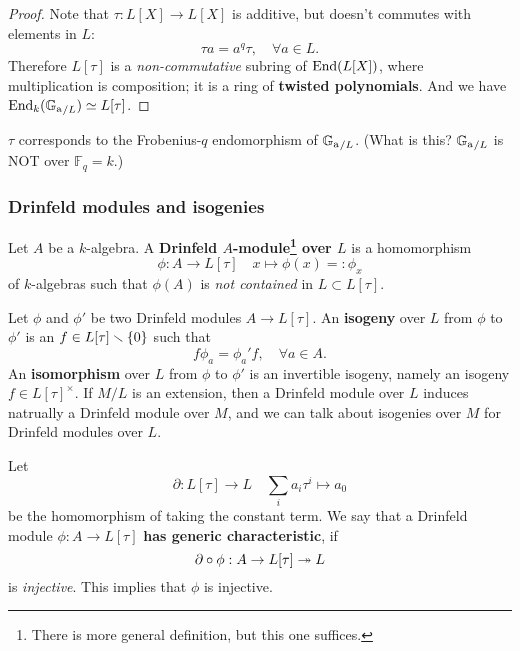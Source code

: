 \documentclass{article}
\newcommand{\F}{\mathbb{F}}
\begin{document}
\begin{proof}
    Note that $\tau : L[X]\to L[X]$ is additive,
    but doesn't commutes with elements in $L$: \[\tau a = a^q\tau,\quad\forall a\in L.\]
    Therefore $L[\tau]$ is a \textit{non-commutative} subring of $\operatorname{End}(L[X])$, where multiplication is composition;
    it is a ring of \textbf{twisted polynomials}. And we have $\operatorname{End}_{k}({\mathbb{G}_{\mathrm{a}}}_{/L})\simeq L[\tau]$.
\end{proof}
\begin{remark}
    $\tau$ corresponds to the Frobenius-$q$ endomorphism of ${\mathbb{G}_{\mathrm{a}}}_{/L}$. (What is this? ${\mathbb{G}_{\mathrm{a}}}_{/L}$ is NOT over $\F_q = k$.)
\end{remark}

\subsubsection{Drinfeld modules and isogenies}
Let $A$ be a $k$-algebra.
A \textbf{Drinfeld $A$-module\footnote{
    There is more general definition, but this one suffices.
} over $L$} is a homomorphism
\[\phi : A\to L[\tau]\quad x\mapsto \phi(x) =: \phi_x\]
of $k$-algebras such that $\phi(A)$ is \textit{not contained} in $L\subset L[\tau]$.

Let $\phi$ and $\phi'$ be two Drinfeld modules $A\to L[\tau]$.
An \textbf{isogeny} over $L$ from $\phi$ to $\phi'$
is an $f\in L[\tau]\smallsetminus\{0\}$ such that \[f\phi_a = \phi_a'f,\quad\forall a\in A.\]
An \textbf{isomorphism} over $L$ from $\phi$ to $\phi'$ is an invertible isogeny, namely an isogeny $f\in L[\tau]^\times$.
If $M/L$ is an extension,
then a Drinfeld module over $L$ induces natrually a Drinfeld module over $M$,
and we can talk about isogenies over $M$ for Drinfeld modules over $L$.





Let \[\partial : L[\tau]\to L\quad \sum_i a_i\tau^i\mapsto a_0\]
be the homomorphism of taking the constant term.
We say that a Drinfeld module $\phi : A\to L[\tau]$ \textbf{has generic characteristic},
if \[\partial\circ \phi : A\to L[\tau]\twoheadrightarrow L\]
is \textit{injective}. This implies that $\phi$ is injective.
\end{document}

